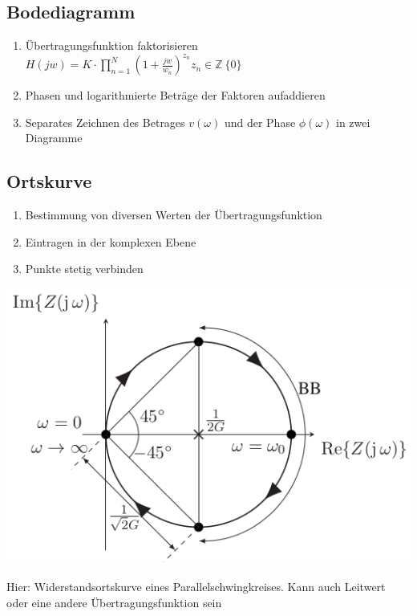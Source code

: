 \documentclass[fs, footer]{latex4ei}
\begin{document}
\begin{multicols*}{4}
\subsection{Bodediagramm}
\begin{enumerate}
	\item Übertragungsfunktion faktorisieren\\
		$H(jw) = K \cdot \prod_{n=1}^N \left(1+\frac{jw}{w_n}\right)^{z_n}$\qquad$z_n \in \mathbb{Z} \ \{0\}$\\
	\item Phasen und logarithmierte Beträge der Faktoren aufaddieren
	\item Separates Zeichnen des Betrages $v(\omega)$ und der Phase $\phi(\omega)$ in zwei Diagramme
\end{enumerate}
\subsection{Ortskurve}
\begin{enumerate}
	\item Bestimmung von diversen Werten der Übertragungsfunktion
	\item Eintragen in der komplexen Ebene
	\item Punkte stetig verbinden
\end{enumerate}
\parbox{.6\linewidth}{
\includegraphics[width=\linewidth]{img/ortskurve-r}}
\parbox{.4\linewidth}{
Hier: Widerstandsortskurve eines Parallelschwingkreises. Kann auch Leitwert oder eine andere Übertragungsfunktion sein}

\end{multicols*}
\end{document}
